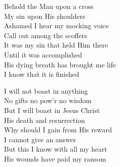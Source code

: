 \documentclass{beamer}
\begin{document}
{\begin{frame}{}
Behold the Man upon a cross\\ 
My sin upon His shoulders\\ 
Ashamed I hear my mocking voice\\ 
Call out among the scoffers\\ 
It was my sin that held Him there\\ 
Until it was accomplished\\ 
His dying breath has brought me life\\ 
I know that it is finished 

\end{frame}

\hypertarget{How deep the Father's love for us[](Townend)3}{}
\begin{frame}{}
\fontsize{ 18 }{ 23 }\selectfont

I will not boast in anything\\ 
No gifts no pow’r no wisdom\\ 
But I will boast in Jesus Christ\\ 
His death and resurrection\\ 
Why should I gain from His reward\\ 
I cannot give an answer\\ 
But this I know with all my heart\\ 
His wounds have paid my ransom 

\end{frame}

}
\end{document}
